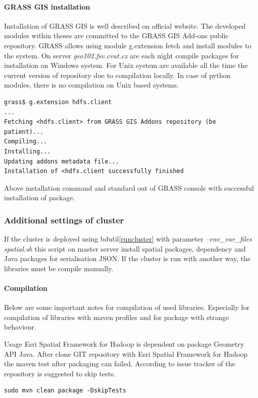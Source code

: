 \documentclass[a4paper,12pt,oneside]{report}
\begin{document}
\paragraph{GRASS GIS installation}
Installation of GRASS GIS is well described on official website. The developed modules within theses are committed to the GRASS GIS Add-ons public repository. GRASS allows using module g.extension fetch and install modules to the system. On server \textit{geo102.fsv.cvut.cz} are each night compile packages for installation on Windows system. For Unix system are available all the time the current version of repository due to compilation locally. In case of python modules, there is no compilation on Unix based systems. 
\begin{footnotesize}
\begin{lstlisting}[style=python]
grass$ g.extension hdfs.client
...
Fetching <hdfs.client> from GRASS GIS Addons repository (be patient)...
Compiling...
Installing...
Updating addons metadata file...
Installation of <hdfs.client successfully finished
\end{lstlisting}
\end{footnotesize}
Above installation command and standard out of GRASS console with successful installation of package. 


\subsubsection{Additional settings of cluster}
If the cluster is deployed using bdutil\ref{runcluster}  with parameter \textit{--env\_var\_files spatial.sh} this script on master server install spatial packages, dependency and Java packages for serialisation JSON. If the cluster is run with another way, the libraries must be compile manually.

\paragraph{Compilation} Below are some important notes for compilation of used libraries. Especially for compilation of libraries with maven profiles and for package with strange behaviour. 

Usage Esri Spatial Framework for Hadoop is dependent on package Geometry API Java. After clone GIT repository with Esri Spatial Framework for Hadoop the maven test after packaging can failed. According to issue tracker of the repository is suggested to skip tests.
\begin{footnotesize}
\begin{lstlisting}[style=python]
sudo mvn clean package -DskipTests 
\end{lstlisting}
\end{footnotesize}
\end{document}
